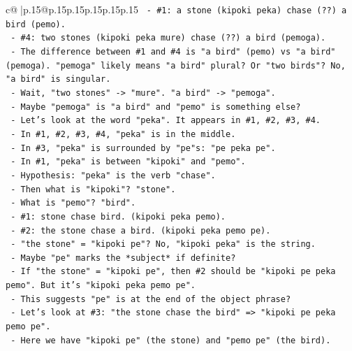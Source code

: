 \documentclass{article}
\begin{document}
{\begin{supertabular}{c@{$\;$}|p{.15\linewidth}@{}p{.15\linewidth}p{.15\linewidth}p{.15\linewidth}p{.15\linewidth}p{.15\linewidth}}
{{{\texttt{                {-} \#1: a stone (kipoki peka) chase (??) a bird (pemo).} \\
\texttt{                {-} \#4: two stones (kipoki peka mure) chase (??) a bird (pemoga).} \\
\texttt{                {-} The difference between \#1 and \#4 is "a bird" (pemo) vs "a bird" (pemoga). "pemoga" likely means "a bird" plural? Or "two birds"? No, "a bird" is singular.} \\
\texttt{                {-} Wait, "two stones" {-}> "mure". "a bird" {-}> "pemoga".} \\
\texttt{                {-} Maybe "pemoga" is "a bird" and "pemo" is something else?} \\
\texttt{                {-} Let's look at the word "peka". It appears in \#1, \#2, \#3, \#4.} \\
\texttt{                {-} In \#1, \#2, \#3, \#4, "peka" is in the middle.} \\
\texttt{                {-} In \#3, "peka" is surrounded by "pe"s: "pe peka pe".} \\
\texttt{                {-} In \#1, "peka" is between "kipoki" and "pemo".} \\
\texttt{                {-} Hypothesis: "peka" is the verb "chase".} \\
\texttt{                {-} Then what is "kipoki"? "stone".} \\
\texttt{                {-} What is "pemo"? "bird".} \\
\texttt{                {-} \#1: stone chase bird. (kipoki peka pemo).} \\
\texttt{                {-} \#2: the stone chase a bird. (kipoki peka pemo pe).} \\
\texttt{                  {-} "the stone" = "kipoki pe"? No, "kipoki peka" is the string.} \\
\texttt{                  {-} Maybe "pe" marks the *subject* if definite?} \\
\texttt{                  {-} If "the stone" = "kipoki pe", then \#2 should be "kipoki pe peka pemo". But it's "kipoki peka pemo pe".} \\
\texttt{                  {-} This suggests "pe" is at the end of the object phrase?} \\
\texttt{                  {-} Let's look at \#3: "the stone chase the bird" => "kipoki pe peka pemo pe".} \\
\texttt{                    {-} Here we have "kipoki pe" (the stone) and "pemo pe" (the bird).} \\
}}}
\end{supertabular}}
\end{document}
